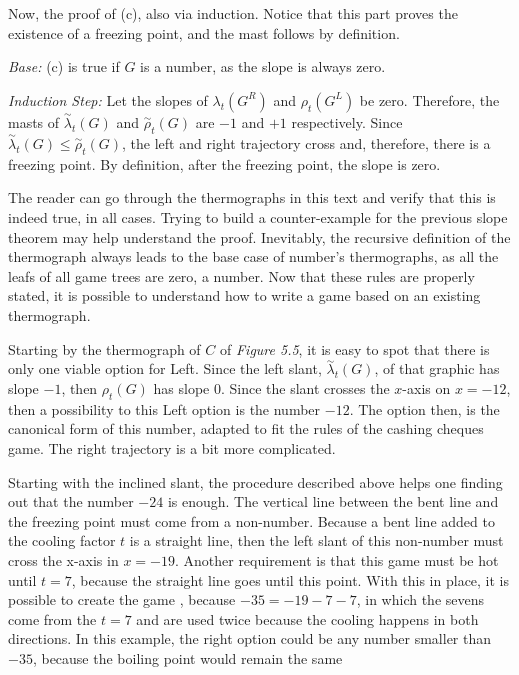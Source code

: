 Now, the proof of (c), also via induction. Notice that this part proves the existence of a freezing point, and the mast follows by definition.

\textit{Base:} (c) is true if $G$ is a number, as the slope is always zero.

\textit{Induction Step:} Let the slopes of $\lambda_t(G^R)$ and $\rho_t(G^L)$ be zero. Therefore, the masts of $\overset{\sim}{\lambda}_t(G)$ and $\overset{\sim}{\rho}_t(G)$ are ${-}1$ and ${+}1$ respectively. Since $\overset{\sim}{\lambda}_t(G) \leq \overset{\sim}{\rho}_t(G)$, the left and right trajectory cross and, therefore, there is a freezing point. By definition, after the freezing point, the slope is zero.

The reader can go through the thermographs in this text and verify that this is indeed true, in all cases. Trying to build a counter-example for the previous slope theorem may help understand the proof. Inevitably, the recursive definition of the thermograph always leads to the base case of number's thermographs, as all the leafs of all game trees are zero, a number. Now that these rules are properly stated, it is possible to understand how to write a game  based on an existing thermograph.

Starting by the thermograph of $C$ of \textit{Figure 5.5}, it is easy to spot that there is only one viable option for Left. Since the left slant, $\overset{\sim}{\lambda}_t(G)$, of that graphic has slope ${-1}$, then $\rho_t(G)$ has slope 0. Since the slant crosses the $x$-axis on $x={-12}$, then a possibility to this Left option is the number ${-12}$. The option then, is the canonical form of this number, adapted to fit the rules of the cashing cheques game. The right trajectory is a bit more complicated.

Starting with the inclined slant, the procedure described above helps one finding out that the number ${-24}$ is enough. The vertical line between the bent line and the freezing point must come from a non-number. Because a bent line added to the cooling factor $t$ is a straight line, then the left slant of this non-number must cross the x-axis in $x={-19}$. Another requirement is that this game must be hot until $t=7$, because the straight line goes until this point. With this in place, it is possible to create the game , because ${-35} = {-19} - 7 - 7$, in which the sevens come from the $t=7$ and are used twice because the cooling happens in both directions. In this example, the right option could be any number smaller than ${-35}$, because the boiling point would remain the same

